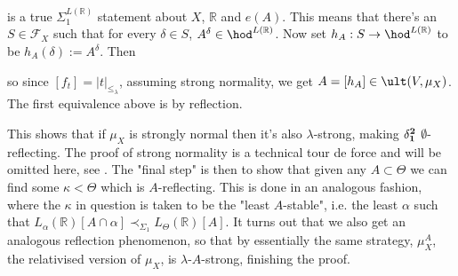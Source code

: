 is a true $\Sigma_1^{L(\mathbb R)}$ statement about $X$, $\mathbb R$ and $e(A)$. This means that there's an $S\in\mathcal F_X$ such that for every $\delta\in S$, $A^\delta\in\hod^{L(\mathbb R)}$. Now set $h_A:S\to\hod^{L(\mathbb R)}$ to be $h_A(\delta):=A^\delta$. Then

so since $[f_t]=|t|_{\leq_\lambda}$, assuming strong normality, we get $A=[h_A]\in\ult(V,\mu_X)$. The first equivalence above is by reflection.

\qquad This shows that if $\mu_X$ is strongly normal then it's also $\lambda$-strong, making $\bf\delta^2_1$ $\emptyset$-reflecting. The proof of strong normality is a technical tour de force and will be omitted here, see \cite{KoellnerWoodin}. The "final step" is then to show that given any $A\subset\Theta$ we can find some $\kappa<\Theta$ which is $A$-reflecting. This is done in an analogous fashion, where the $\kappa$ in question is taken to be the "least $A$-stable", i.e. the least $\alpha$ such that $L_\alpha(\mathbb R)[A\cap\alpha]\prec_{\Sigma_1} L_\Theta(\mathbb R)[A]$. It turns out that we also get an analogous reflection phenomenon, so that by essentially the same strategy, $\mu_X^A$, the relativised version of $\mu_X$, is $\lambda$-$A$-strong, finishing the proof.


\nocite{*}



